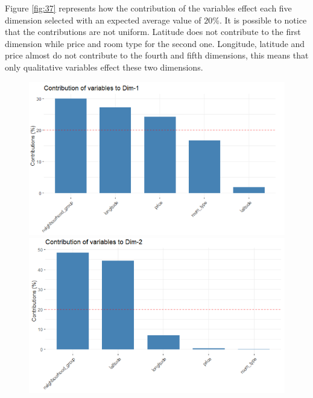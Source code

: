 \documentclass{FR16}
\begin{document}
\newpage
\noindent Figure \ref{fig:37} represents how the contribution of the variables effect each five dimension selected with an expected average value of $20\%$. It is possible to notice that the contributions are not uniform. Latitude does not contribute to the first dimension while price and room type for the second one. Longitude, latitude and price almost do not contribute to the fourth and fifth dimensions, this means that only qualitative variables effect these two dimensions.
\begin{figure}[!htb]
   \begin{minipage}{0.33\textwidth}
     \centering
     \includegraphics[width=1\linewidth]{figures/FAMD7.png} 
   \end{minipage}\hfill
   \begin{minipage}{0.33\textwidth}
     \centering
     \includegraphics[width=1\linewidth]{figures/FAMD8.png}
   \end{minipage}
   \begin{minipage}{0.33\textwidth}
     \centering

\end{minipage}
\end{figure}
\end{document}
